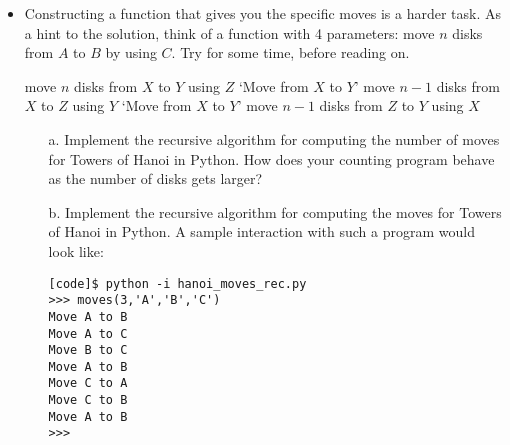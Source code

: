 \documentclass[a4paper]{article}
\begin{document}
{\begin{itemize}
\begin{ucodeframe}
\hspace{1em}
\begin{algorithmic}
 \Comment compute number of moves for $n$ disks
\State{}
\Else
\State\Return ($2\times$ ) $+1$
	\EndIf
\EndFunction
\end{algorithmic}
\end{ucodeframe}

\item Constructing a function that gives you the specific moves is a harder task. 
As a hint to the solution, think of a function with 4 parameters:
move $n$ disks from $A$ to $B$ by using $C$. Try for some time, before reading
on.



\begin{ualgorithmic}
 \Comment move $n$ disks from $X$ to $Y$ using $Z$
		\State\Print `Move from $X$ to $Y$' 
	\Else
		\State{} \Comment move $n-1$ disks from $X$ to $Z$ using $Y$
		\State\Print `Move from $X$ to $Y$'
		\State{} \Comment move $n-1$ disks from $Z$ to $Y$ using $X$
	\EndIf
\EndFunction
\end{ualgorithmic}

\begin{uexercise}
\begin{itemize}
\item[]
\item[a.] Implement the recursive algorithm for computing the number of moves for Towers of Hanoi in Python. How does your counting
program behave as the number of disks gets larger?

\item[b.] Implement the recursive algorithm for computing the moves for Towers
of Hanoi in Python. A sample interaction with such a program would look like: 

\begin{ucodeframe}
\begin{Verbatim}
[code]$ python -i hanoi_moves_rec.py 
>>> moves(3,'A','B','C')
Move A to B
Move A to C
Move B to C
Move A to B
Move C to A
Move C to B
Move A to B
>>> 
\end{Verbatim}
\end{ucodeframe}

\end{itemize}
\end{uexercise}


\end{itemize}}
\end{document}
